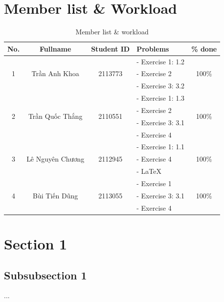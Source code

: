 \documentclass[a4paper]{article}
\begin{document}
\pagebreak
\tableofcontents
\pagebreak

\printunsrtglossary[type={symbols}, title={List of Symbols}]
\printunsrtglossary[type={abbreviations}, title={List of Acronyms}]
\pagebreak
\listoffigures
\listoftables
\pagebreak
{}


\section*{Member list \& Workload}
\begin{center}
\begin{table}[h]
\centering
\begin{tabular}{|c|c|c|l|c|}
\hline
\textbf{No.} & \textbf{Fullname} & \textbf{Student ID} & \textbf{Problems} & \textbf{\% done}\\
\hline 
\multirow{3}{*}{1} & \multirow{3}{*}{Trần Anh Khoa} & \multirow{3}{*}{2113773} & 
- Exercise 1: 1.2& \multirow{3}{*}{100\%}\\
 & &  & - Exercise 2&\\
 & &  & - Exercise 3: 3.2&\\
\hline 
\multirow{4}{*}{2} & \multirow{4}{*}{Trần Quốc Thắng} & \multirow{4}{*}{2110551} & 
- Exercise 1: 1.3& \multirow{4}{*}{100\%}\\
 & &  & - Exercise 2&\\
 & &  & - Exercise 3: 3.1&\\
 & &  & - Exercise 4&\\
\hline
\multirow{3}{*}{3} & \multirow{3}{*}{Lê Nguyên Chương} & \multirow{3}{*}{2112945} & 
- Exercise 1: 1.1& \multirow{3}{*}{100\%}\\
 & &  & - Exercise 4&\\
 & &  & - \LaTeX  &\\
\hline
\multirow{3}{*}{4} & \multirow{3}{*}{Bùi Tiến Dũng} & \multirow{3}{*}{2113055} & 
- Exercise 1& \multirow{3}{*}{100\%}\\
 & &  & - Exercise 3: 3.1&\\
 & &  & - Exercise 4&\\
\hline
\end{tabular}
\caption{\label{table1}Member list \& workload}
\end{table}
\end{center}


\pagebreak


\section{Section 1}
\subsection{Subsubsection 1}
...


\pagebreak
\nocite{*}
\printbibliography[
heading=bibintoc,
title={References}
]
\end{document}
